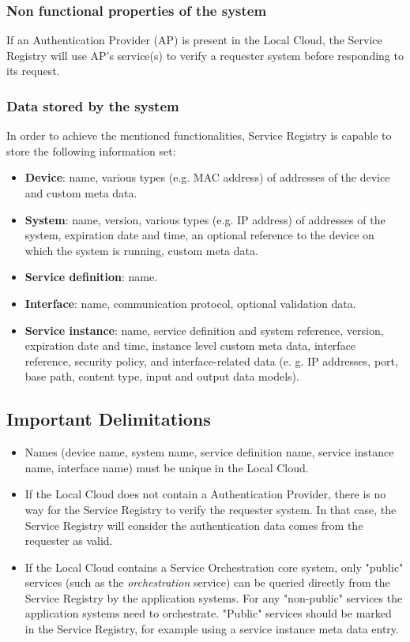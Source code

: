 \documentclass[a4paper]{arrowhead}
\begin{document}
\subsubsection {Non functional properties of the system}
If an Authentication Provider (AP) is present in the Local Cloud, the Service Registry will use AP's service(s) to verify a requester system before responding to its request.

\subsubsection {Data stored by the system}
In order to achieve the mentioned functionalities, Service Registry is capable to store the following information set:

\begin{itemize}
    \item \textbf{Device}: name, various types (e.g. MAC address) of addresses of the device and custom meta data.
    \item \textbf{System}: name, version, various types (e.g. IP address) of addresses of the system, expiration date and time, an optional reference to the device on which the system is running, custom meta data. 
    \item \textbf{Service definition}: name.
    \item \textbf{Interface}: name, communication protocol, optional validation data.
    \item \textbf{Service instance}: name, service definition and system reference, version, expiration date and time, instance level custom meta data, interface reference, security policy, and interface-related data (e. g. IP addresses, port, base path, content type, input and output data models).
\end{itemize}

\subsection{Important Delimitations}
\label{sec:delimitations}

\begin{itemize}
    \item Names (device name, system name, service definition name, service instance name, interface name) must be unique in the Local Cloud.
    \item If the Local Cloud does not contain a Authentication Provider, there is no way for the Service Registry to verify the requester system. In that case, the Service Registry will consider the authentication data comes from the requester as valid.
    \item If the Local Cloud contains a Service Orchestration core system, only "public" services (such as the \textit{orchestration} service) can be queried directly from the Service Registry by the application systems. For any "non-public" services the application systems need to orchestrate. "Public" services should be marked in the Service Registry, for example using a service instance meta data entry.
\end{itemize}
\end{document}
